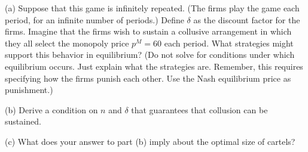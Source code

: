 \documentclass{article}
\begin{document}
(a) Suppose that this game is infinitely repeated. (The firms play the
game each period, for an infinite number of periods.) Define $\delta$  as the
discount factor for the firms. Imagine that the firms wish to sustain
a collusive arrangement in which they all select the monopoly price
$p^M = 60$ each period. What strategies might support this behavior in
equilibrium? (Do not solve for conditions under which equilibrium
occurs. Just explain what the strategies are. Remember, this requires
specifying how the firms punish each other. Use the Nash equilibrium
price as punishment.)

(b) Derive a condition on $n$ and $\delta$ that guarantees that collusion can be
sustained.

(c) What does your answer to part (b) imply about the optimal size of
cartels?
\end{document}
